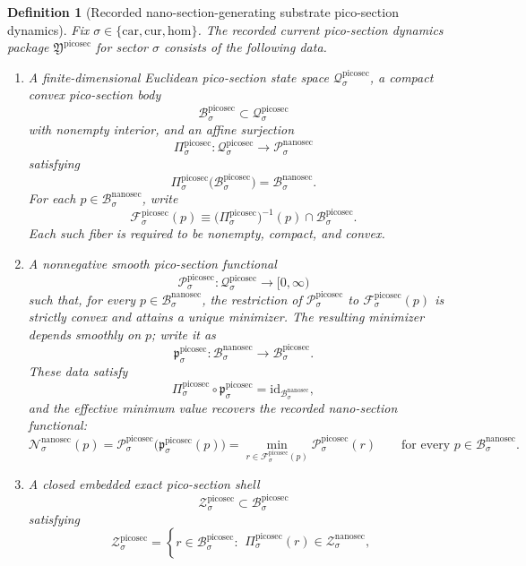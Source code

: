 \documentclass[11pt]{article}
\newcommand{\Car}{\mathrm{car}}
\newcommand{\Cur}{\mathrm{cur}}
\newcommand{\Hom}{\mathrm{hom}}
\newcommand{\NanoSectionSpace}[1]{\mathcal P_{#1}^{\mathrm{nanosec}}}
\newcommand{\NanoSectionBody}[1]{\mathcal B_{#1}^{\mathrm{nanosec}}}
\newcommand{\NanoSectionFunctional}[1]{\mathscr N_{#1}^{\mathrm{nanosec}}}
\newcommand{\NanoSectionShell}[1]{\mathcal Z_{#1}^{\mathrm{nanosec}}}
\newcommand{\PicoSectionPackage}{\mathfrak Y^{\mathrm{picosec}}}
\newcommand{\PicoSectionSpace}[1]{\mathcal Q_{#1}^{\mathrm{picosec}}}
\newcommand{\PicoSectionBody}[1]{\mathcal B_{#1}^{\mathrm{picosec}}}
\newcommand{\PicoSectionProj}[1]{\Pi_{#1}^{\mathrm{picosec}}}
\newcommand{\PicoSectionFiber}[2]{\mathcal F_{#1}^{\mathrm{picosec}}(#2)}
\newcommand{\PicoSectionNanoMin}[1]{\mathfrak p_{#1}^{\mathrm{picosec}}}
\newcommand{\PicoSectionFunctional}[1]{\mathscr P_{#1}^{\mathrm{picosec}}}
\newcommand{\PicoSectionShell}[1]{\mathcal Z_{#1}^{\mathrm{picosec}}}
\newtheorem{definition}{Definition}
\begin{document}
\begin{definition}[Recorded nano-section-generating substrate pico-section dynamics]
\label{def:picosec}
Fix \(\sigma\in\{\Car,\Cur,\Hom\}\). The recorded current pico-section dynamics package \(\PicoSectionPackage\) for sector \(\sigma\) consists of the following data.
\begin{enumerate}
    \item A finite-dimensional Euclidean pico-section state space \(\PicoSectionSpace{\sigma}\), a compact convex pico-section body
    \[
    \PicoSectionBody{\sigma}\subset\PicoSectionSpace{\sigma}
    \]
    with nonempty interior, and an affine surjection
    \[
    \PicoSectionProj{\sigma}:\PicoSectionSpace{\sigma}\to\NanoSectionSpace{\sigma}
    \]
    satisfying
    \[
    \PicoSectionProj{\sigma}\bigl(\PicoSectionBody{\sigma}\bigr)=\NanoSectionBody{\sigma}.
    \]
    For each \(p\in\NanoSectionBody{\sigma}\), write
    \[
    \PicoSectionFiber{\sigma}{p}
    \equiv
    \bigl(\PicoSectionProj{\sigma}\bigr)^{-1}(p)\cap\PicoSectionBody{\sigma}.
    \]
    Each such fiber is required to be nonempty, compact, and convex.
    \item A nonnegative smooth pico-section functional
    \[
    \PicoSectionFunctional{\sigma}:\PicoSectionSpace{\sigma}\to[0,\infty)
    \]
    such that, for every \(p\in\NanoSectionBody{\sigma}\), the restriction of \(\PicoSectionFunctional{\sigma}\) to \(\PicoSectionFiber{\sigma}{p}\) is strictly convex and attains a unique minimizer. The resulting minimizer depends smoothly on \(p\); write it as
    \[
    \PicoSectionNanoMin{\sigma}:\NanoSectionBody{\sigma}\to\PicoSectionBody{\sigma}.
    \]
    These data satisfy
    \[
    \PicoSectionProj{\sigma}\circ\PicoSectionNanoMin{\sigma}
    =
    \mathrm{id}_{\NanoSectionBody{\sigma}},
    \]
    and the effective minimum value recovers the recorded nano-section functional:
    \[
    \NanoSectionFunctional{\sigma}(p)
    =
    \PicoSectionFunctional{\sigma}\bigl(\PicoSectionNanoMin{\sigma}(p)\bigr)
    =
    \min_{r\in\PicoSectionFiber{\sigma}{p}}
    \PicoSectionFunctional{\sigma}(r)
    \qquad
    \text{for every }
    p\in\NanoSectionBody{\sigma}.
    \]
    \item A closed embedded exact pico-section shell
    \[
    \PicoSectionShell{\sigma}\subset\PicoSectionBody{\sigma}
    \]
    satisfying
    \[
    \PicoSectionShell{\sigma}
    =
    \left\{
    r\in\PicoSectionBody{\sigma}:
    \begin{array}{l}
    \PicoSectionProj{\sigma}(r)\in\NanoSectionShell{\sigma},\\[0.2em]

\end{array}\]
\end{enumerate}
\end{definition}
\end{document}
